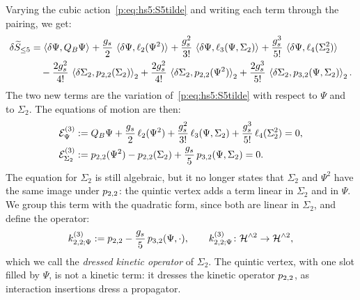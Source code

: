 Varying the cubic action~\eqref{p:eq:hs5:S5tilde} and writing each term through the pairing, we get:
\begin{equation}
  \label{p:eq:hs5:delta-S}
  \begin{aligned}
    \delta \caction[\le 5]
      &
      = \pair{\delta \Psi}{Q_B \Psi}
        + \frac{\gs}{2} \, \pair{\delta \Psi}{\ell_2(\Psi^2)}
        + \frac{\gs^2}{3!} \, \pair{\delta \Psi}{\ell_3(\Psi, \Sigma_2)}
        + \frac{\gs^3}{5!} \, \pair{\delta \Psi}{\ell_4(\Sigma_2^2)}
        \\ &
        \quad
        - \frac{2 \gs^2}{4!} \, \pair[2]{\delta \Sigma_2}{\sprod{2}{2}(\Sigma_2)}
        + \frac{2 \gs^2}{4!} \, \pair[2]{\delta \Sigma_2}{\sprod{2}{2}(\Psi^2)}
        + \frac{2 \gs^3}{5!} \, \pair[2]{\delta \Sigma_2}{\sprod{3}{2}(\Psi, \Sigma_2)}.
  \end{aligned}
\end{equation}
The two new terms are the variation of~\eqref{p:eq:hs5:S5tilde} with respect to $\Psi$ and to $\Sigma_2$.
The equations of motion are then:
\begin{subequations}
  \label{p:eq:hs5:eom}
  \begin{align}
    \label{p:eq:hs5:eom-psi}
    \mathcal E^{(3)}_\Psi
      &
      := Q_B \Psi
        + \frac{\gs}{2} \, \ell_2(\Psi^2)
        + \frac{\gs^2}{3!} \, \ell_3(\Psi, \Sigma_2)
        + \frac{\gs^3}{5!} \, \ell_4(\Sigma_2^2)
      = 0,
    \\
    \label{p:eq:hs5:eom-sigma}
    \mathcal E^{(3)}_{\Sigma_2}
      &
      := \sprod{2}{2}(\Psi^2)
        - \sprod{2}{2}(\Sigma_2)
        + \frac{\gs}{5} \, \sprod{3}{2}(\Psi, \Sigma_2)
      = 0.
  \end{align}
\end{subequations}
The equation for $\Sigma_2$ is still algebraic, but it no longer states that $\Sigma_2$ and $\Psi^2$ have the same image under $\sprod{2}{2}$: the quintic vertex adds a term linear in $\Sigma_2$ and in $\Psi$.
We group this term with the quadratic form, since both are linear in $\Sigma_2$, and define the operator:
\begin{equation}
  \label{p:eq:hs5:dressed}
  \kin{2}{\Psi}{3}
    := \sprod{2}{2} - \frac{\gs}{5} \, \sprod{3}{2}(\Psi, \cdot),
  \qquad
  \kin{2}{\Psi}{3} \colon \Hn{2} \to \Hn{2},
\end{equation}
which we call the \emph{dressed kinetic operator} of $\Sigma_2$.
The quintic vertex, with one slot filled by $\Psi$, is not a kinetic term: it dresses the kinetic operator $\sprod{2}{2}$, as interaction insertions dress a propagator.
